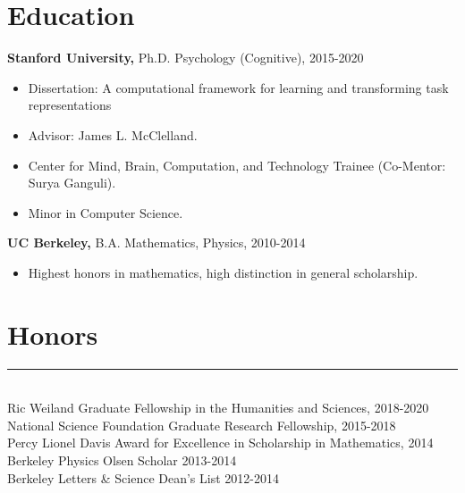 \documentclass[margin]{res}
\begin{document}
 
 
 
\address{{\bf Email} \\ andrewlampinen@gmail.com}
\address{{\bf Website} \\\url{https://lampinen.github.io}}
\begin{resume} 
\section{Education} 
{\bf Stanford University,} Ph.D. Psychology (Cognitive), 2015-2020
\begin{itemize} \itemsep -2pt \item Dissertation: A computational framework for learning and transforming task representations \item Advisor: James L. McClelland. \item Center for Mind, Brain, Computation, and Technology Trainee (Co-Mentor: Surya Ganguli). \item Minor in Computer Science.\end{itemize}
{\bf UC Berkeley,}  B.A. Mathematics, Physics, 2010-2014 \begin{itemize} \itemsep -2pt \item Highest honors in mathematics, high distinction in general scholarship.%
\end{itemize}
\vspace{1pt}\section{Honors} \vspace{-15pt} \rule{\textwidth}{0.5pt} \\[3pt]
Ric Weiland Graduate Fellowship in the Humanities and Sciences, 2018-2020 \\
National Science Foundation Graduate Research Fellowship, 2015-2018 \\
Percy Lionel Davis Award for Excellence in Scholarship in Mathematics, 2014 \\ 
Berkeley Physics Olsen Scholar 2013-2014 \\
Berkeley Letters \& Science Dean's List 2012-2014\\

\end{resume}
\end{document}
